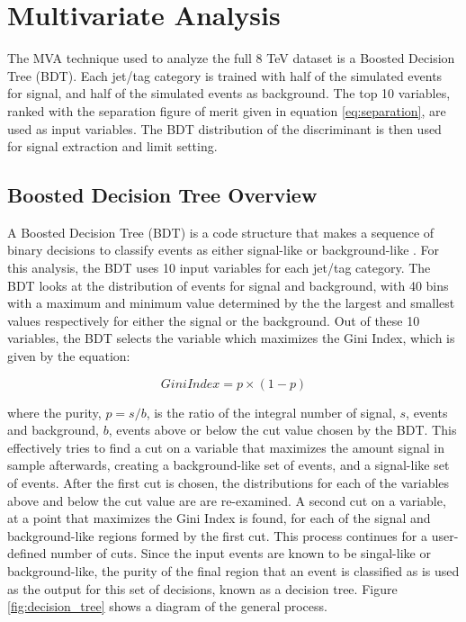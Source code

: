 \section{Multivariate Analysis}
\label{mva_II_overview}

\par The MVA technique used to analyze the full 8 TeV dataset is a
Boosted Decision Tree (BDT).  Each jet/tag category is trained with
half of the simulated \ttH events for signal, and half of the
simulated \ttjets events as background.  The top 10 variables, ranked
with the separation figure of merit given in equation
\ref{eq:separation}, are used as input variables.  The BDT
distribution of the discriminant is then used for signal extraction
and limit setting. 


\subsection{Boosted Decision Tree Overview}
\label{bdt_overview}

\par A Boosted Decision Tree (BDT) is a code structure that makes a
sequence of binary decisions to classify events as either signal-like
or background-like \cite{Hocker:2007ht}.  For this analysis, the BDT
uses 10 input variables for each jet/tag category.  The BDT looks at
the distribution of events for signal and background, with 40 bins
with a maximum and minimum value determined by the the largest and
smallest values respectively for either the signal or the background.
Out of these 10 variables, the BDT selects the variable which
maximizes the Gini Index, which is given by the equation:

\begin{equation}\label{eq:gini_index}
Gini Index = p\times(1 - p)
\end{equation}

\noindent where the purity, $p=s/b$, is the ratio of the integral
number of signal, $s$, events and background, $b$, events above or
below the cut value chosen by the BDT.  This effectively tries to find
a cut on a variable that maximizes the amount signal in sample
afterwards, creating a background-like set of events, and a
signal-like set of events.  After the first cut is chosen, the
distributions for each of the variables above and below the cut value
are are re-examined.  A second cut on a variable, at a point that
maximizes the Gini Index is found, for each of the signal and
background-like regions formed by the first cut.  This process
continues for a user-defined number of cuts.  Since the input events
are known to be singal-like or background-like, the purity of the
final region that an event is classified as is used as the output for
this set of decisions, known as a decision tree.  Figure
\ref{fig:decision_tree} shows a diagram of the general process.

